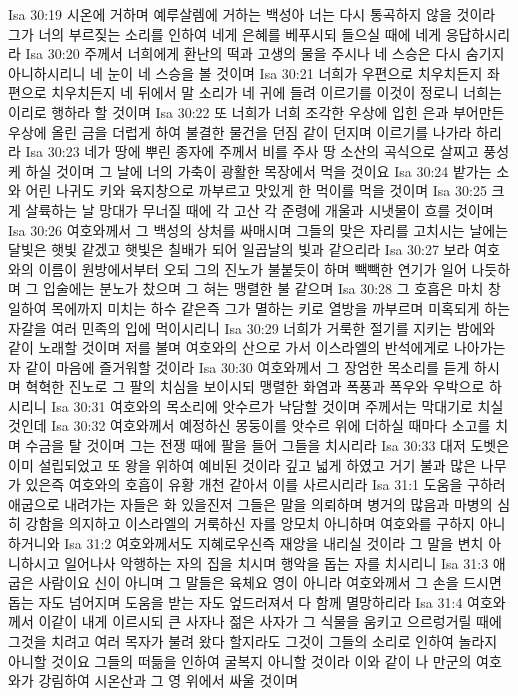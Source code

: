 Isa 30:19  시온에 거하며 예루살렘에 거하는 백성아 너는 다시 통곡하지 않을 것이라 그가 너의 부르짖는 소리를 인하여 네게 은혜를 베푸시되 들으실 때에 네게 응답하시리라
Isa 30:20  주께서 너희에게 환난의 떡과 고생의 물을 주시나 네 스승은 다시 숨기지 아니하시리니 네 눈이 네 스승을 볼 것이며
Isa 30:21  너희가 우편으로 치우치든지 좌편으로 치우치든지 네 뒤에서 말 소리가 네 귀에 들려 이르기를 이것이 정로니 너희는 이리로 행하라 할 것이며
Isa 30:22  또 너희가 너희 조각한 우상에 입힌 은과 부어만든 우상에 올린 금을 더럽게 하여 불결한 물건을 던짐 같이 던지며 이르기를 나가라 하리라
Isa 30:23  네가 땅에 뿌린 종자에 주께서 비를 주사 땅 소산의 곡식으로 살찌고 풍성케 하실 것이며 그 날에 너의 가축이 광활한 목장에서 먹을 것이요
Isa 30:24  밭가는 소와 어린 나귀도 키와 육지창으로 까부르고 맛있게 한 먹이를 먹을 것이며
Isa 30:25  크게 살륙하는 날 망대가 무너질 때에 각 고산 각 준령에 개울과 시냇물이 흐를 것이며
Isa 30:26  여호와께서 그 백성의 상처를 싸매시며 그들의 맞은 자리를 고치시는 날에는 달빛은 햇빛 같겠고 햇빛은 칠배가 되어 일곱날의 빛과 같으리라
Isa 30:27  보라 여호와의 이름이 원방에서부터 오되 그의 진노가 불붙듯이 하며 빽빽한 연기가 일어 나듯하며 그 입술에는 분노가 찼으며 그 혀는 맹렬한 불 같으며
Isa 30:28  그 호흡은 마치 창일하여 목에까지 미치는 하수 같은즉 그가 멸하는 키로 열방을 까부르며 미혹되게 하는 자갈을 여러 민족의 입에 먹이시리니
Isa 30:29  너희가 거룩한 절기를 지키는 밤에와 같이 노래할 것이며 저를 불며 여호와의 산으로 가서 이스라엘의 반석에게로 나아가는 자 같이 마음에 즐거워할 것이라
Isa 30:30  여호와께서 그 장엄한 목소리를 듣게 하시며 혁혁한 진노로 그 팔의 치심을 보이시되 맹렬한 화염과 폭풍과 폭우와 우박으로 하시리니
Isa 30:31  여호와의 목소리에 앗수르가 낙담할 것이며 주께서는 막대기로 치실 것인데
Isa 30:32  여호와께서 예정하신 몽둥이를 앗수르 위에 더하실 때마다 소고를 치며 수금을 탈 것이며 그는 전쟁 때에 팔을 들어 그들을 치시리라
Isa 30:33  대저 도벳은 이미 설립되었고 또 왕을 위하여 예비된 것이라 깊고 넓게 하였고 거기 불과 많은 나무가 있은즉 여호와의 호흡이 유황 개천 같아서 이를 사르시리라
Isa 31:1  도움을 구하러 애굽으로 내려가는 자들은 화 있을진저 그들은 말을 의뢰하며 병거의 많음과 마병의 심히 강함을 의지하고 이스라엘의 거룩하신 자를 앙모치 아니하며 여호와를 구하지 아니하거니와
Isa 31:2  여호와께서도 지혜로우신즉 재앙을 내리실 것이라 그 말을 변치 아니하시고 일어나사 악행하는 자의 집을 치시며 행악을 돕는 자를 치시리니
Isa 31:3  애굽은 사람이요 신이 아니며 그 말들은 육체요 영이 아니라 여호와께서 그 손을 드시면 돕는 자도 넘어지며 도움을 받는 자도 엎드러져서 다 함께 멸망하리라
Isa 31:4  여호와께서 이같이 내게 이르시되 큰 사자나 젊은 사자가 그 식물을 움키고 으르렁거릴 때에 그것을 치려고 여러 목자가 불려 왔다 할지라도 그것이 그들의 소리로 인하여 놀라지 아니할 것이요 그들의 떠듦을 인하여 굴복지 아니할 것이라 이와 같이 나 만군의 여호와가 강림하여 시온산과 그 영 위에서 싸울 것이며
